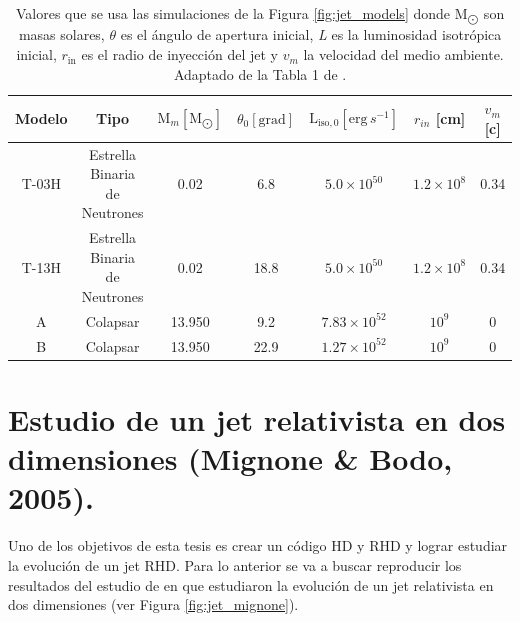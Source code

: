 \documentclass[12pt,a4paper]{book}
\begin{document}
\begin{table}
  \begin{center}
    \begin{tabular}{ c c c c c c c} 
      \hline
      Modelo & Tipo                          & $\text{M}_{m} [\text{M}_{\bigodot}]$  & $\theta_0 [\text{grad}]$ & $\text{L}_{\text{iso},0}  [\text{erg}\,s^{-1}]$ & $r_{in} $ [cm]             & $v_m$ [c]               \\
      \hline
      T-03H  & Estrella Binaria de Neutrones & 0.02                                  &    6.8                   &               $5.0   \times 10^{50}$            &     $1.2 \times 10^8$      &   0.34  \\ 
      T-13H  & Estrella Binaria de Neutrones & 0.02                                  &    18.8                  &               $5.0   \times 10^{50}$            &     $1.2 \times 10^8$      &   0.34  \\ 
      A      & Colapsar                      & 13.950                                &    9.2                   &               $7.83  \times 10^{52}$            &     $10^9$                 &       0                 \\ 
      B      & Colapsar                      & 13.950                                &    22.9                  &               $1.27  \times 10^{52}$            &     $10^9$                 &       0                 \\ 
    \end{tabular}
  \caption{Valores que se usa las simulaciones de la Figura \ref{fig:jet_models} donde $\text{M}_{\bigodot}$ son masas solares, $\theta$ es el ángulo de apertura inicial, \emph{L} es la luminosidad isotrópica inicial,
  $r_{\text{in}}$ es el radio de inyección del jet y $v_m$ la velocidad del medio ambiente. Adaptado de la Tabla 1 de \citet{JBEMGRB}.} \label{table:jet_models}
  \end{center}
\end{table}

\section{Estudio de un jet relativista en dos dimensiones (Mignone \& Bodo, 2005).}
Uno de los objetivos de esta tesis es crear un código HD y RHD y lograr estudiar la evolución de un jet RHD. Para lo anterior se va a buscar reproducir los resultados del estudio de \citet{MB-HLLC-I} en 
que estudiaron la evolución de un jet relativista en dos dimensiones (ver Figura \ref{fig:jet_mignone}). 
\end{document}
